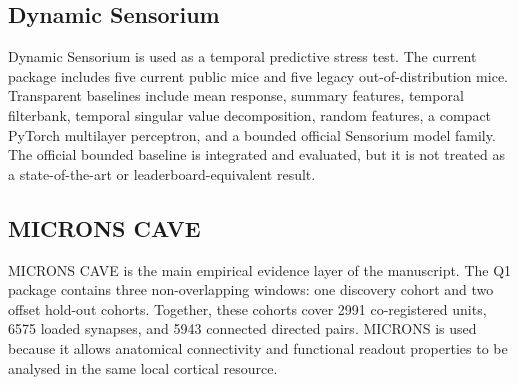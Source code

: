 \subsection{Dynamic Sensorium}

Dynamic Sensorium is used as a temporal predictive stress test. The current
package includes five current public mice and five legacy out-of-distribution
mice. Transparent baselines include mean response, summary features, temporal
filterbank, temporal singular value decomposition, random features, a compact
PyTorch multilayer perceptron, and a bounded official Sensorium model family.
The official bounded baseline is integrated and evaluated, but it is not treated
as a state-of-the-art or leaderboard-equivalent result.

\subsection{MICRONS CAVE}

MICRONS CAVE is the main empirical evidence layer of the manuscript. The Q1
package contains three non-overlapping windows: one discovery cohort and two
offset hold-out cohorts. Together, these cohorts cover 2991 co-registered
units, 6575 loaded synapses, and 5943 connected directed pairs. MICRONS is used
because it allows anatomical connectivity and functional readout properties to
be analysed in the same local cortical resource.
